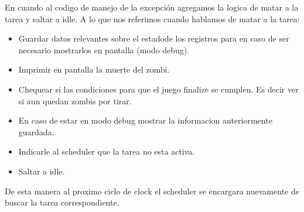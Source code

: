	En cuando al codigo de manejo de la excepción agregamos la logica de matar a la tarea y saltar a idle. A lo que nos referimos cuando hablamos de matar a la tarea:

	\begin{itemize}
		\item{Guardar datos relevantes sobre el estadode los registros para en caso de ser necesario mostrarlos en pantalla (modo debug).}
		\item{Imprimir en pantalla la muerte del zombi.}
		\item{Chequear si las condiciones para que el juego finalize se cumplen. Es decir ver si aun quedan zombis por tirar.}
		\item{En caso de estar en modo debug mostrar la informacion anteriormente guardada.}
		\item{Indicarle al scheduler que la tarea no esta activa.}
		\item{Saltar a idle.}
	\end{itemize} 

	De esta manera al proximo ciclo de clock el scheduler se encargara nuevamente de buscar la tarea correspondiente.